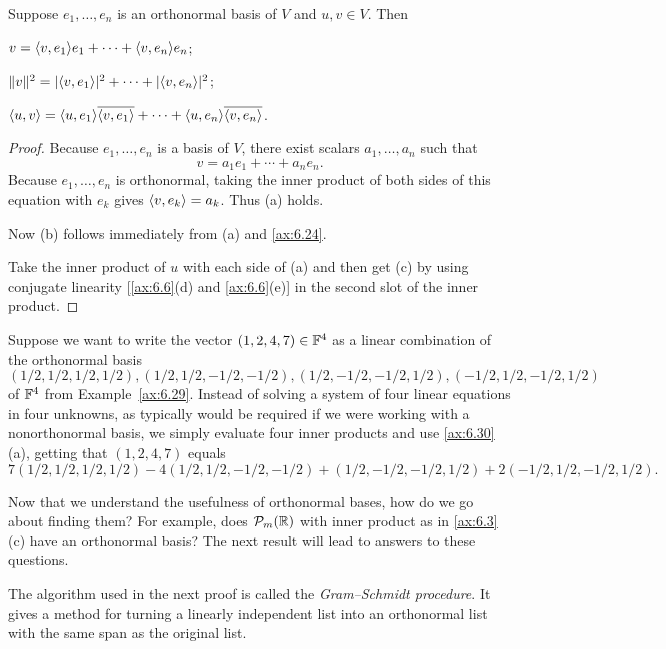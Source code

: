 \begin{result}\label{ax:6.30}
Suppose $e_1,\dots,e_n$ is an orthonormal basis of $V$ and $u,v\in V$. Then
\begin{parts}
\item $v=\langle v, e_1 \rangle e_1+\cdots+\langle v, e_n \rangle e_n$;
\item $\lVert v \rVert^2=\lvert \langle v, e_1 \rangle \rvert^2+\cdots+\lvert \langle v, e_n \rangle \rvert^2$;
\item $\langle u, v \rangle=\langle u, e_1 \rangle\overline{\langle v, e_1 \rangle}+\cdots
  +\langle u, e_n \rangle\overline{\langle v, e_n \rangle}$.
\end{parts}
\end{result}

\begin{proof}
Because $e_1,\dots,e_n$ is a basis of $V$, there exist scalars $a_1,\dots,a_n$
such that
\[ v = a_1e_1+\cdots+a_ne_n. \]
Because $e_1,\dots,e_n$ is orthonormal, taking the inner product of both sides of
this equation with $e_k$ gives $\langle v, e_k \rangle=a_k$. Thus (a) holds.

Now (b) follows immediately from (a) and \ref{ax:6.24}.

Take the inner product of $u$ with each side of (a) and then get (c) by using
conjugate linearity [\ref{ax:6.6}(d) and \ref{ax:6.6}(e)] in the second slot of
the inner product.
\end{proof}

\begin{example}\label{ax:6.31}
Suppose we want to write the vector $(1,2,4,7)\in\mathbb{F}^4$ as a linear combination
of the orthonormal basis
\[ (1/2,1/2,1/2,1/2),
   (1/2,1/2,-1/2,-1/2),
   (1/2,-1/2,-1/2,1/2),
   (-1/2,1/2,-1/2,1/2) \]
of $\mathbb{F}^4$ from Example~\ref{ax:6.29}. Instead of solving a system of four linear
equations in four unknowns, as typically would be required if we were working
with a nonorthonormal basis, we simply evaluate four inner products and use
\ref{ax:6.30}(a), getting that $(1,2,4,7)$ equals
\[ 7(1/2,1/2,1/2,1/2)
   -4(1/2,1/2,-1/2,-1/2)
   +(1/2,-1/2,-1/2,1/2)
   +2(-1/2,1/2,-1/2,1/2). \]
\end{example}

Now that we understand the usefulness of orthonormal bases, how do we go about
finding them? For example, does $\mathcal{P}_m(\mathbb{R})$ with inner product as in
\ref{ax:6.3}(c) have an orthonormal basis? The next result will lead to answers
to these questions.

%
The algorithm used in the next proof is called the \emph{Gram--Schmidt
procedure}. It gives a method for turning a linearly independent list into an
orthonormal list with the same span as the original list.

